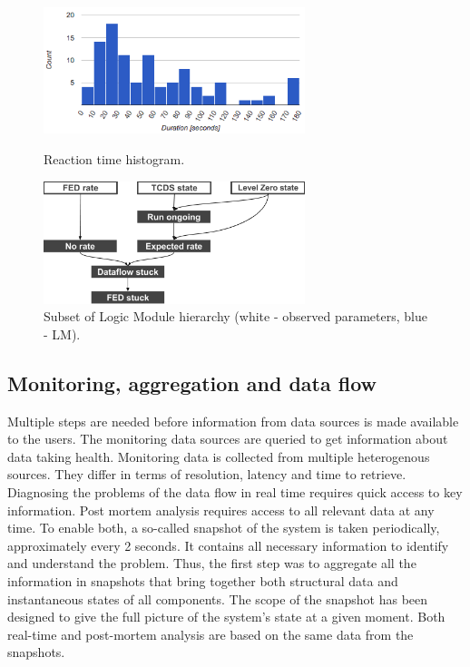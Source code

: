 \documentclass[a4paper]{jpconf}
\begin{document}
\begin{figure}[h]
\begin{minipage}{18pc}
\includegraphics[width=18pc]{reaction-histogram-2016.png}
\caption{\label{reaction-histogram}Reaction time histogram.}
\end{minipage}\hspace{2pc}%
\begin{minipage}{18pc}
\includegraphics[width=18pc]{logic-module-hierarchy.png}
\caption{\label{subsetoflm}Subset of Logic Module hierarchy (white - observed parameters, blue - LM). }
\end{minipage} 
\end{figure}


\subsection{Monitoring, aggregation and data flow}

Multiple steps are needed before information from data sources is made available to the users. The monitoring data sources are queried to get information about data taking health. Monitoring data is collected from multiple heterogenous sources. They differ in terms of resolution, latency and time to retrieve. Diagnosing the problems of the data flow in real time requires quick access to key information. Post mortem analysis requires access to all relevant data at any time. To enable both, a so-called snapshot of the system is taken periodically, approximately every 2 seconds. It contains all necessary information to identify and understand the problem. Thus, the first step was to aggregate all the information in snapshots that bring together both structural data and instantaneous states of all components. The scope of the snapshot has been designed to give the full picture of the system's state at a given moment. Both real-time and post-mortem analysis are based on the same data from the snapshots.
\end{document}
